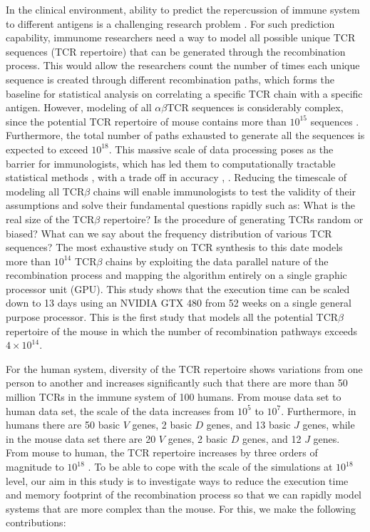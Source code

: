 In the clinical environment, ability to predict the repercussion of immune system to different antigens is a challenging research problem \cite{b37, b17, b18, b19, b20}. For such prediction capability, immunome researchers need a way to model all possible unique TCR sequences (TCR repertoire) that can be generated through the recombination process. This would allow the researchers count the number of times each unique sequence is created through different recombination paths, which forms the baseline for statistical analysis on correlating a specific TCR chain with a specific antigen. However, modeling of all $\alpha\beta$TCR sequences is considerably complex, since the potential TCR repertoire of mouse contains more than $10^{15}$ sequences \cite{b24}. Furthermore, the total number of paths exhausted to generate all the sequences is expected to exceed $10^{18}$. This massive scale of data processing poses as the barrier for immunologists, which has led them to computationally tractable statistical methods \cite{b21}, \cite{b22}  with a trade off  in accuracy \cite{b21}, \cite{b22} . Reducing the timescale of modeling all TCR$\beta$ chains will enable immunologists to test the validity of their assumptions and solve their fundamental questions rapidly such as: What is the real size of the TCR$\beta$ repertoire? Is the procedure of generating TCRs random or biased? What can we say about the frequency distribution of various TCR sequences? The most exhaustive study on TCR synthesis to this date \cite{b2} models more than $10^{14}$ TCR$\beta$ chains by exploiting the data parallel nature of the recombination process and mapping the algorithm entirely on a single graphic processor unit (GPU). This study shows that the execution time can be scaled down to 13 days using an NVIDIA GTX 480 from 52 weeks on a single general purpose processor. This is the first study that models all the potential TCR$\beta$ repertoire of the mouse in which the number of recombination pathways exceeds ${4\times 10^{14}}$.


For the human system, diversity of the TCR repertoire shows variations from one person to another and increases significantly such that there are more than 50 million TCRs in the immune system of 100 humans. From mouse data set to human data set, the scale of the data increases from $10^{5}$ to $10^{7}$. Furthermore, in humans there are 50 basic $V$ genes, 2 basic $D$ genes, and 13 basic $J$ genes, while in the mouse data set there are 20 $V$ genes, 2 basic $D$ genes, and 12 $J$ genes. From mouse to human, the TCR repertoire increases by three orders of magnitude to $10^{18}$ \cite{b2}. To be able to cope with the scale of the simulations at $10^{18}$ level, our aim in this study is to investigate ways to reduce the execution time and memory footprint of the recombination process so that we can rapidly model systems that are more complex than the mouse. For this, we make the following contributions:

